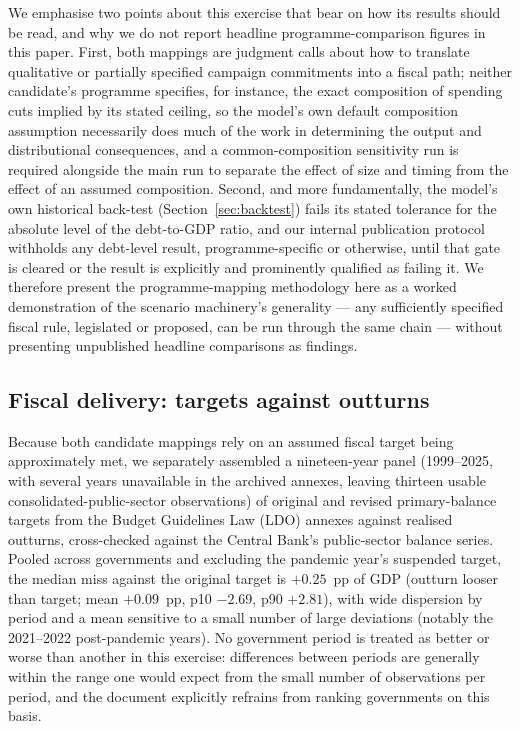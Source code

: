 \documentclass[11pt,a4paper]{article}
\begin{document}
We emphasise two points about this exercise that bear on how its results should be read, and why we do not report headline programme-comparison figures in this paper. First, both mappings are judgment calls about how to translate qualitative or partially specified campaign commitments into a fiscal path; neither candidate's programme specifies, for instance, the exact composition of spending cuts implied by its stated ceiling, so the model's own default composition assumption necessarily does much of the work in determining the output and distributional consequences, and a common-composition sensitivity run is required alongside the main run to separate the effect of size and timing from the effect of an assumed composition. Second, and more fundamentally, the model's own historical back-test (Section~\ref{sec:backtest}) fails its stated tolerance for the absolute level of the debt-to-GDP ratio, and our internal publication protocol withholds any debt-level result, programme-specific or otherwise, until that gate is cleared or the result is explicitly and prominently qualified as failing it. We therefore present the programme-mapping methodology here as a worked demonstration of the scenario machinery's generality --- any sufficiently specified fiscal rule, legislated or proposed, can be run through the same chain --- without presenting unpublished headline comparisons as findings.

\subsection{Fiscal delivery: targets against outturns}
\label{sec:f1}

Because both candidate mappings rely on an assumed fiscal target being approximately met, we separately assembled a nineteen-year panel (1999--2025, with several years unavailable in the archived annexes, leaving thirteen usable consolidated-public-sector observations) of original and revised primary-balance targets from the Budget Guidelines Law (LDO) annexes against realised outturns, cross-checked against the Central Bank's public-sector balance series. Pooled across governments and excluding the pandemic year's suspended target, the median miss against the original target is $+0.25$~pp of GDP (outturn looser than target; mean $+0.09$~pp, p10 $-2.69$, p90 $+2.81$), with wide dispersion by period and a mean sensitive to a small number of large deviations (notably the 2021--2022 post-pandemic years). No government period is treated as better or worse than another in this exercise: differences between periods are generally within the range one would expect from the small number of observations per period, and the document explicitly refrains from ranking governments on this basis.
\end{document}
